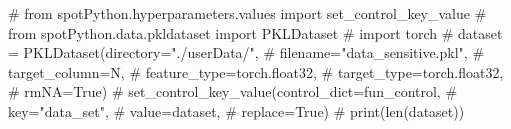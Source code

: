 \documentclass[
  letterpaper,
  DIV=11,
  numbers=noendperiod]{scrreprt}
\newenvironment{Shaded}{\begin{snugshade}}{\end{snugshade}}
\newcommand{\CommentTok}[1]{\textcolor[rgb]{0.37,0.37,0.37}{#1}}
\begin{document}
\begin{Shaded}
\begin{Highlighting}[]
\CommentTok{\# from spotPython.hyperparameters.values import set\_control\_key\_value}
\CommentTok{\# from spotPython.data.pkldataset import PKLDataset}
\CommentTok{\# import torch}
\CommentTok{\# dataset = PKLDataset(directory="./userData/",}
\CommentTok{\#                      filename="data\_sensitive.pkl",}
\CommentTok{\#                      target\_column=\textquotesingle{}N\textquotesingle{},}
\CommentTok{\#                      feature\_type=torch.float32,}
\CommentTok{\#                      target\_type=torch.float32,}
\CommentTok{\#                      rmNA=True)}
\CommentTok{\# set\_control\_key\_value(control\_dict=fun\_control,}
\CommentTok{\#                         key="data\_set",}
\CommentTok{\#                         value=dataset,}
\CommentTok{\#                         replace=True)}
\CommentTok{\# print(len(dataset))}
\end{Highlighting}
\end{Shaded}
\end{document}
